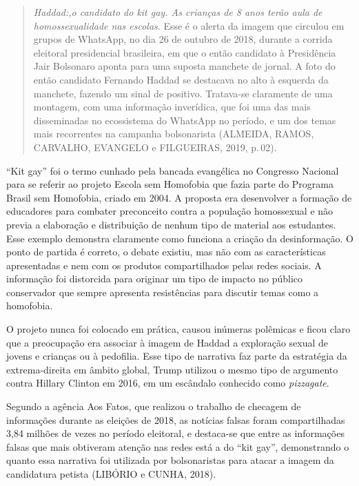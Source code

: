 \begin{quote}
\textit{Haddad:,o candidato do \emph{kit gay}. As crianças de 8 anos terão aula de
homossexualidade nas escolas}. Esse é o alerta da imagem que circulou
em grupos de WhatsApp, no dia 26 de outubro de 2018, durante a corrida
eleitoral presidencial brasileira, em que o então candidato à
Presidência Jair Bolsonaro aponta para uma suposta manchete de
jornal. A foto do então candidato Fernando Haddad se destacava no
alto à esquerda da manchete, fazendo um sinal de positivo. Tratava-se
claramente de uma montagem, com uma informação inverídica, que foi uma
das mais disseminadas no ecossistema do WhatsApp no período, e um dos
temas mais recorrentes na campanha bolsonarista (ALMEIDA, RAMOS,
CARVALHO, EVANGELO e FILGUEIRAS, 2019, p.\,02).
\end{quote}

``Kit gay'' foi o termo cunhado pela bancada evangélica no Congresso
Nacional para se referir ao projeto Escola sem Homofobia que fazia
parte do Programa Brasil sem Homofobia, criado em 2004. A proposta era
desenvolver a formação de educadores para combater preconceito contra a
população homossexual e não previa a elaboração e distribuição de nenhum
tipo de material aos estudantes. Esse exemplo demonstra claramente como
funciona a criação da desinformação. O ponto de partida é correto, o
debate existiu, mas não com as características apresentadas e nem com os
produtos compartilhados pelas redes sociais. A informação foi distorcida
para originar um tipo de impacto no público conservador que sempre
apresenta resistências para discutir temas como a homofobia.

O projeto nunca foi colocado em prática, causou inúmeras polêmicas e
ficou claro que a preocupação era associar à imagem de Haddad a
exploração sexual de jovens e crianças ou à pedofilia. Esse tipo de
narrativa faz parte da estratégia da extrema-direita em âmbito global,
Trump utilizou o mesmo tipo de argumento contra Hillary Clinton em 2016,
em um escândalo conhecido como \textit{pizzagate}.

Segundo a agência Aos Fatos, que realizou o trabalho de checagem de
informações durante as eleições de 2018, as notícias falsas foram
compartilhadas 3,84 milhões de vezes no período eleitoral, e destaca-se
que entre as informações falsas que mais obtiveram atenção nas redes
está a do ``kit gay'', demonstrando o quanto essa narrativa foi
utilizada por bolsonaristas para atacar a imagem da candidatura petista
(LIBÓRIO e CUNHA, 2018).

